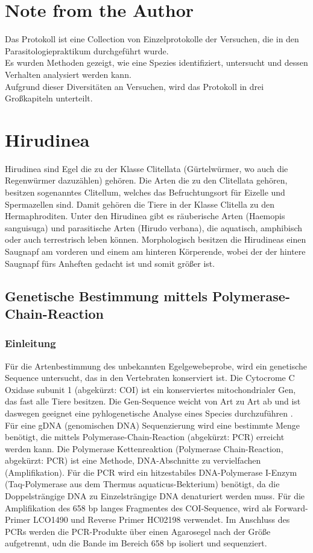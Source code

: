 \documentclass[oneside,10pt,a4paper]{report}
\begin{document}
	
	\tableofcontents
	\chapter{Note from the Author}
	Das Protokoll ist eine Collection von Einzelprotokolle der Versuchen, die in den Parasitologiepraktikum durchgeführt wurde.\\
	Es wurden Methoden gezeigt, wie eine Spezies identifiziert, untersucht und dessen Verhalten analysiert werden kann.\\
	Aufgrund dieser Diversitäten an Versuchen, wird das Protokoll in drei Großkapiteln unterteilt.
	
	
	\chapter{Hirudinea}	
	Hirudinea sind Egel die zu der Klasse Clitellata (Gürtelwürmer, wo auch die Regenwürmer dazuzählen) gehören. Die Arten die zu den Clitellata gehören, besitzen sogenanntes Clitellum, welches das Befruchtungsort für Eizelle und Spermazellen sind. Damit gehören die Tiere in der Klasse Clitella zu den Hermaphroditen.
	Unter den Hirudinea gibt es räuberische Arten (Haemopis sanguisuga) und parasitische Arten (Hirudo verbana), die aquatisch, amphibisch oder auch terrestrisch leben können.
	Morphologisch besitzen die Hirudineas einen Saugnapf am vorderen und einem am hinteren Körperende, wobei der der hintere Saugnapf fürs Anheften gedacht ist und somit größer ist.
	
	\section{Genetische Bestimmung mittels Polymerase-Chain-Reaction}
	\subsection{Einleitung}
	Für die Artenbestimmung des unbekannten Egelgewebeprobe, wird ein genetische Sequence untersucht, das in den Vertebraten konserviert ist. Die Cytocrome C Oxidase subunit 1 (abgekürzt: COI) ist ein konserviertes mitochondrialer
	Gen, das fast alle Tiere besitzen. Die Gen-Sequence weicht von Art zu Art ab und ist daswegen geeignet eine pyhlogenetische Analyse eines Species durchzuführen \cite{Folmer}.
	Für eine gDNA (genomischen DNA) Sequenzierung wird eine bestimmte Menge benötigt, die mittels Polymerase-Chain-Reaction (abgekürzt: PCR) erreicht werden kann.
	Die Polymerase Kettenreaktion (Polymerase Chain-Reaction, abgekürzt: PCR) ist eine Methode, DNA-Abschnitte zu vervielfachen (Amplifikation).
	Für die PCR wird ein hitzestabiles DNA-Polymerase I-Enzym (Taq-Polymerase aus dem Thermus aquaticus-Bekterium) benötigt, da die Doppelsträngige DNA zu Einzelsträngige DNA denaturiert werden muss.
	Für die Amplifikation des 658 bp langes Fragmentes des COI-Sequence, wird als Forward-Primer LCO1490 und Reverse Primer HC02198 verwendet.
	Im Anschluss des PCRs werden die PCR-Produkte über einen Agarosegel nach der Größe aufgetrennt, udn die Bande im Bereich 658 bp isoliert und sequenziert.
\end{document}
